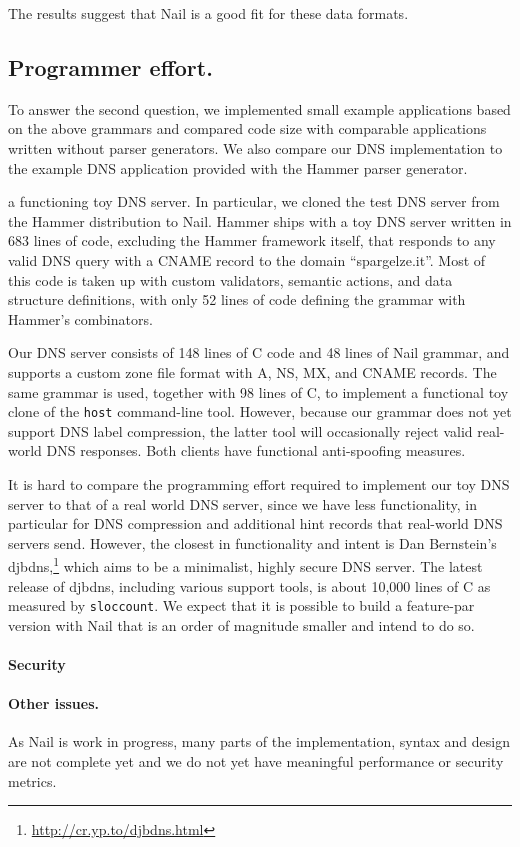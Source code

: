 The results suggest that Nail is a good fit for these data formats. 



\subsection{Programmer effort.}
\label{s:eval-effort}
To answer the second question, we implemented small example applications based on the above
grammars and compared code size with comparable applications written without parser generators. We
also compare our DNS implementation to the example DNS application provided with the Hammer parser generator.



 a functioning toy DNS
server.  In particular, we cloned the test DNS server from the Hammer
distribution to Nail.  Hammer ships with a toy DNS server written in 683
lines of code, excluding the Hammer framework itself, that responds to
any valid DNS query with a CNAME record to the domain ``spargelze.it''.
Most of this code is taken up with custom validators, semantic actions,
and data structure definitions, with only 52 lines of code defining the
grammar with Hammer's combinators.

Our DNS server consists of 148 lines of C code and 48 lines of Nail
grammar, and supports a custom zone file format with A, NS, MX, and
CNAME records. The same grammar is used, together with 98 lines of C,
to implement a functional toy clone of the \texttt{host} command-line
tool. However, because our grammar does not yet support DNS label
compression, the latter tool will occasionally reject valid real-world
DNS responses. Both clients have functional anti-spoofing measures.

It is hard to compare the programming effort required to implement
our toy DNS server to that of a real world DNS server, since
we have less functionality, in particular for DNS compression
and additional hint records that real-world DNS servers send.
However, the closest in functionality and intent is Dan Bernstein's
djbdns,\footnote{\url{http://cr.yp.to/djbdns.html}} which aims to be
a minimalist, highly secure DNS server. The latest release of djbdns,
including various support tools, is about 10,000 lines of C as measured by
\texttt{sloccount}.  We expect that it is possible to build a feature-par
version with Nail that is an order of magnitude smaller and intend to
do so.

\paragraph{Security} 
 
\paragraph{Other issues.}

As Nail is work in progress, many parts of the implementation, syntax and
design are not complete yet and we do not yet have meaningful performance
or security metrics.

